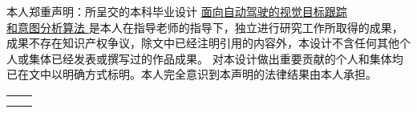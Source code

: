 
\begin{declarationzh}
	
	本人郑重声明：所呈交的本科毕业设计 \uline{ 面向自动驾驶的视觉目标跟踪\\和意图分析算法 } 是本人在指导老师的指导下，独立进行研究工作所取得的成果，成果不存在知识产权争议，除文中已经注明引用的内容外，本设计不含任何其他个人或集体已经发表或撰写过的作品成果。
	对本设计做出重要贡献的个人和集体均已在文中以明确方式标明。本人完全意识到本声明的法律结果由本人承担。
	
	\vspace{30pt}
	\begin{tabular}{ll}
		\hspace{240pt} \makebox[4em][s]{作者签名：} & \underline{\makebox[100pt][c]{  }} \\
		\hspace{240pt} \makebox[4em][s]{日\qquad 期:}	 &
		\underline{\makebox[100pt][c]{\qquad 年\quad 月\quad   日 }} \\
	\end{tabular}
	
	
	
\end{declarationzh}
